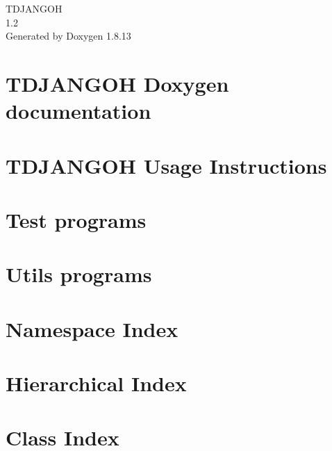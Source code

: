 \documentclass[twoside]{book}
\newcommand{\+}{\discretionary{\mbox{\scriptsize$\hookleftarrow$}}{}{}}
\newcommand{\clearemptydoublepage}{%
  \newpage{\pagestyle{empty}\cleardoublepage}%
}
\begin{document}
\hypersetup{pageanchor=false,
             bookmarksnumbered=true,
             pdfencoding=unicode
            }
\begin{titlepage}
\vspace*{7cm}
\begin{center}%
{\Large T\+D\+J\+A\+N\+G\+OH \\[1ex]\large 1.\+2 }\\
\vspace*{1cm}
{\large Generated by Doxygen 1.8.13}\\
\end{center}
\end{titlepage}
\clearemptydoublepage
{}
\tableofcontents
\clearemptydoublepage
{}
\hypersetup{pageanchor=true}

\chapter{T\+D\+J\+A\+N\+G\+OH Doxygen documentation}
\label{index}\hypertarget{index}{}
\chapter{T\+D\+J\+A\+N\+G\+OH Usage Instructions}
\label{md__r_e_a_d_m_e}

\chapter{Test programs}
\label{md_test__t_e_s_t_p_r_o_g_r_a_m_s}

\chapter{Utils programs}
\label{md_utils__u_t_i_l_s_p_r_o_g_r_a_m_s}

\chapter{Namespace Index}

\chapter{Hierarchical Index}

\chapter{Class Index}

\end{document}
